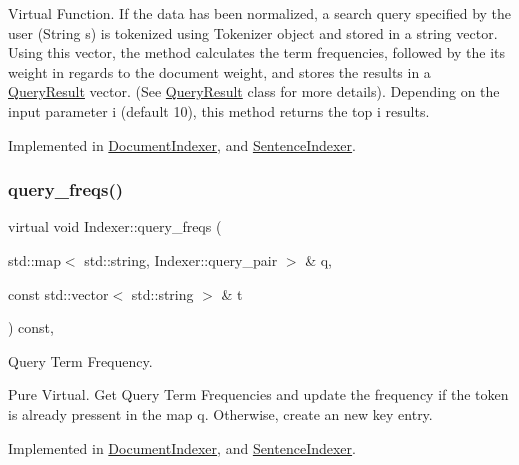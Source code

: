 Virtual Function. If the data has been normalized, a search query specified by the user (String s) is tokenized using Tokenizer object and stored in a string vector. Using this vector, the method calculates the term frequencies, followed by the its weight in regards to the document weight, and stores the results in a \hyperlink{class_query_result}{Query\+Result} vector. (See \hyperlink{class_query_result}{Query\+Result} class for more details). Depending on the input parameter i (default 10), this method returns the top i results. 

Implemented in \hyperlink{class_document_indexer_af14be24c72be4b3eb165da9c504ec7d1}{Document\+Indexer}, and \hyperlink{class_sentence_indexer_acc4165c39f2193050d207861936927a7}{Sentence\+Indexer}.

\mbox{\label{class_indexer_a0587f6a4d61620219473bf583ecdbad5}} 
\subsubsection{\texorpdfstring{query\+\_\+freqs()}{query\_freqs()}}
{\footnotesize\ttfamily virtual void Indexer\+::query\+\_\+freqs (\begin{DoxyParamCaption}\item[{std\+::map$<$ std\+::string, Indexer\+::query\+\_\+pair $>$ \&}]{q,  }\item[{const std\+::vector$<$ std\+::string $>$ \&}]{t }\end{DoxyParamCaption}) const\hspace{0.3cm}{\ttfamily [protected]}, {}}



Query Term Frequency. 

Pure Virtual. Get Query Term Frequencies and update the frequency if the token is already pressent in the map q. Otherwise, create an new key entry. 

Implemented in \hyperlink{class_document_indexer_a48d441022f2f6ea3437f5a67b318e06e}{Document\+Indexer}, and \hyperlink{class_sentence_indexer_af059ce5526fad2995f5595ace00e51a3}{Sentence\+Indexer}.

\mbox{\label{class_indexer_a74819336b6d9883483c09349ebdf43b8}} 
